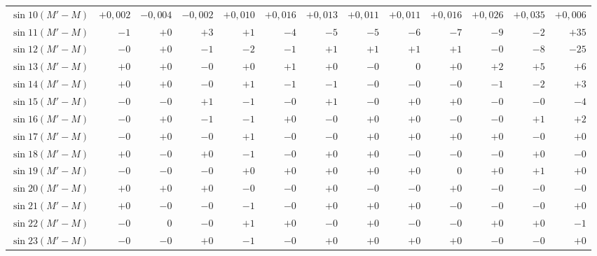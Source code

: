 \begin{landscape}
\begin{longtable}{@{}l|r|r|r|r|r|r|r|r|r|r|r|r@{}}
\(\sin 10(M'-M)\) & \(+0{,}002\) & \(-0{,}004\) & \(-0{,}002\) & \(+0{,}010\) & \(+0{,}016\) & \(+0{,}013\) & \(+0{,}011\) & \(+0{,}011\) & \(+0{,}016\) & \(+0{,}026\) & \(+0{,}035\) & \(+0{,}006\)\\
\(\sin 11(M'-M)\) & \(-1\) & \(+0\) & \(+3\) & \(+1\) & \(-4\) & \(-5\) & \(-5\) & \(-6\) & \(-7\) & \(-9\) & \(-2\) & \(+35\)\\
\(\sin 12(M'-M)\) & \(-0\) & \(+0\) & \(-1\) & \(-2\) & \(-1\) & \(+1\) & \(+1\) & \(+1\) & \(+1\) & \(-0\) & \(-8\) & \(-25\)\\
\(\sin 13(M'-M)\) & \(+0\) & \(+0\) & \(-0\) & \(+0\) & \(+1\) & \(+0\) & \(-0\) & \(0\) & \(+0\) & \(+2\) & \(+5\) & \(+6\)\\
\(\sin 14(M'-M)\) & \(+0\) & \(+0\) & \(-0\) & \(+1\) & \(-1\) & \(-1\) & \(-0\) & \(-0\) & \(-0\) & \(-1\) & \(-2\) & \(+3\)\\
\(\sin 15(M'-M)\) & \(-0\) & \(-0\) & \(+1\) & \(-1\) & \(-0\) & \(+1\) & \(-0\) & \(+0\) & \(+0\) & \(-0\) & \(-0\) & \(-4\)\\
\(\sin 16(M'-M)\) & \(-0\) & \(+0\) & \(-1\) & \(-1\) & \(+0\) & \(-0\) & \(+0\) & \(+0\) & \(-0\) & \(-0\) & \(+1\) & \(+2\)\\
\(\sin 17(M'-M)\) & \(-0\) & \(+0\) & \(-0\) & \(+1\) & \(-0\) & \(-0\) & \(+0\) & \(+0\) & \(+0\) & \(+0\) & \(-0\) & \(+0\)\\
\(\sin 18(M'-M)\) & \(+0\) & \(-0\) & \(+0\) & \(-1\) & \(-0\) & \(+0\) & \(+0\) & \(-0\) & \(-0\) & \(-0\) & \(+0\) & \(-0\)\\
\(\sin 19(M'-M)\) & \(-0\) & \(-0\) & \(-0\) & \(+0\) & \(+0\) & \(+0\) & \(+0\) & \(+0\) & \(0\) & \(+0\) & \(+1\) & \(+0\)\\
\(\sin 20(M'-M)\) & \(+0\) & \(+0\) & \(+0\) & \(-0\) & \(-0\) & \(+0\) & \(-0\) & \(-0\) & \(+0\) & \(-0\) & \(-0\) & \(-0\)\\
\(\sin 21(M'-M)\) & \(+0\) & \(-0\) & \(-0\) & \(-1\) & \(-0\) & \(+0\) & \(+0\) & \(+0\) & \(-0\) & \(-0\) & \(-0\) & \(+0\)\\
\(\sin 22(M'-M)\) & \(-0\) & \(0\) & \(-0\) & \(+1\) & \(+0\) & \(-0\) & \(+0\) & \(-0\) & \(-0\) & \(+0\) & \(+0\) & \(-1\)\\
\(\sin 23(M'-M)\) & \(-0\) & \(-0\) & \(+0\) & \(-1\) & \(-0\) & \(+0\) & \(+0\) & \(+0\) & \(+0\) & \(-0\) & \(-0\) & \(+0\)\\
\end{longtable}
\clearpage
\endgroup
\clearpage
\begingroup
\fontsize{8.5}{10.5}\selectfont
{}

\end{landscape}
